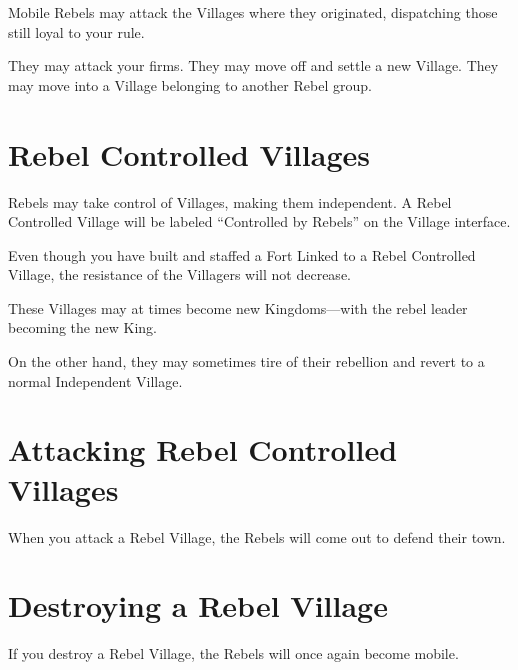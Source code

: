Mobile Rebels may attack the Villages where they originated, dispatching those still loyal to your rule.

They may attack your firms.
They may move off and settle a new Village.
They may move into a Village belonging to another Rebel group.

\section{Rebel Controlled Villages}

Rebels may take control of Villages, making them independent. A Rebel Controlled Village will be labeled “Controlled by Rebels” on the Village interface.

Even though you have built and staffed a Fort Linked to a Rebel Controlled Village, the resistance of the Villagers will not decrease.

These Villages may at times become new Kingdoms---with the rebel leader becoming the new King.

On the other hand, they may sometimes tire of their rebellion and revert to a normal Independent Village.

\section{Attacking Rebel Controlled Villages}

 When you attack a Rebel Village, the Rebels will come out to defend their town.

\section{Destroying a Rebel Village}

If you destroy a Rebel Village, the Rebels will once again become mobile.